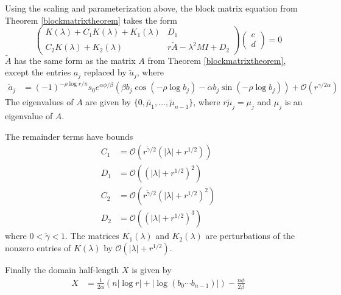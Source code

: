 \documentclass[thesis.tex]{subfiles}
\begin{document}
\begin{lemma}\label{reparam}
Using the scaling and parameterization above, the block matrix equation from Theorem \ref{blockmatrixtheorem} takes the form
\begin{equation}\label{blockeq2}
\begin{pmatrix}
K(\lambda) + C_1 K(\lambda) + K_1(\lambda) & D_1 \\
C_2 K(\lambda) + K_2(\lambda) & r \tilde{A} - \lambda^2 MI + D_2
\end{pmatrix}
\begin{pmatrix}c \\ d \end{pmatrix} 
= 0
\end{equation}
$\tilde{A}$ has the same form as the matrix $A$ from Theorem \ref{blockmatrixtheorem}, except the entries $a_j$ replaced by $\tilde{a}_j$, where
\begin{align}\label{tildea}
\tilde{a}_j 
&= (-1)^{-\rho \log r / \pi} s_0 e^{\alpha \phi/\beta} \left( \beta b_j \cos\left( -\rho \log b_j \right) - \alpha b_j \sin \left( -\rho \log b_j  \right) \right) + \mathcal{O}(r^{\gamma/2\alpha})
\end{align}
The eigenvalues of $A$ are given by $\{0, \tilde{\mu_1}, \dots, \tilde{\mu}_{n-1} \}$, where $r \tilde{\mu}_j = \mu_j$ and $\mu_j$ is an eigenvalue of $A$.

The remainder terms have bounds
\begin{align*}
C_1 &= \mathcal{O}\left(r^{\tilde{\gamma}/2}(|\lambda| + r^{1/2})\right) \\
D_1 &= \mathcal{O}\left((|\lambda| + r^{1/2})^2\right) \\
C_2 &= \mathcal{O}\left(r^{\tilde{\gamma}/2}(|\lambda| + r^{1/2})^2\right) \\
D_2 &= \mathcal{O}\left((|\lambda| + r^{1/2})^3\right)
\end{align*}
where $0 < \tilde{\gamma} < 1$. The matrices $K_1(\lambda)$ and $K_2(\lambda)$ are perturbations of the nonzero entries of $K(\lambda)$ by $\mathcal{O}(|\lambda| + r^{1/2})$.

Finally the domain half-length $X$ is given by
\begin{align}\label{Xscaled}
X &= \frac{1}{2\alpha} (n |\log r| + |\log (b_0\cdots b_{n-1})| ) - \frac{n \phi}{2 \beta}
\end{align}


\end{lemma}
\end{document}
